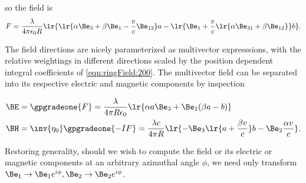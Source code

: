so the field is
\begin{dmath}\label{eqn:ringField:220}
F
=
\frac{\lambda}{4 \pi \epsilon_0 R}
\lr{
\lr{ \alpha \Be_3 + \beta \Be_1 -\frac{v }{c}\Be_{12} } a
- \lr{
\Be_1 + \frac{v}{c} \lr{ \alpha \Be_{31} + \beta \Be_{12} } } b
}.
\end{dmath}

The field directions are nicely parameterized as multivector expresssions, with the relative weightings in different directions scaled by the position dependent integral coefficients of \cref{eqn:ringField:200}.
The multivector field can be separated into its respective electric and magnetic components by inspection

\begin{dmath}\label{eqn:ringField:240}
\begin{aligned}
\BE &=
\gpgradeone{F}
=
\frac{\lambda}{4 \pi R \epsilon_0} \lr{ \alpha a \Be_3 + \Be_1( \beta a - b) } \\
\BH &=
\inv{\eta_0} \gpgradeone{-I F}
=
\frac{\lambda c}{4 \pi R } \lr{ -\Be_3 \lr{ a + \frac{\beta v}{c} } b - \Be_2 \frac{\alpha v}{c} }.
\end{aligned}
\end{dmath}

Restoring generality, 
should we wish to compute the field or its electric or magnetic components at an arbitrary azimuthal angle \( \phi \), we need only transform \( \Be_1 \rightarrow \Be_1 e^{i \phi}, \Be_2 \rightarrow \Be_2 e^{i\phi} \).

